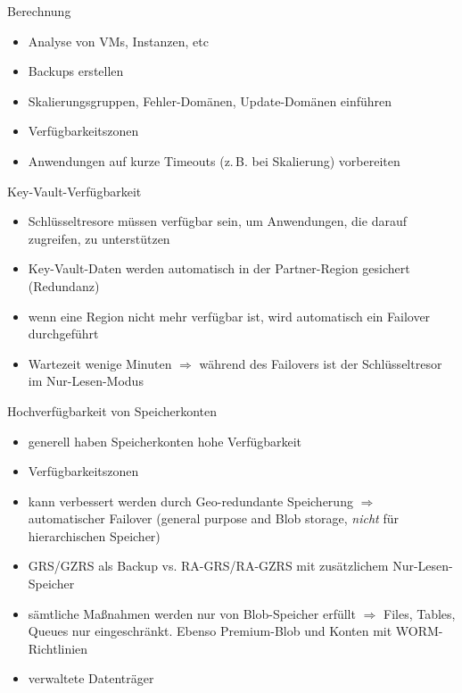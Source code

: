 \begin{flashcard}[]{Berechnung}
  \begin{itemize}
    \item Analyse von VMs, Instanzen, etc
    \item Backups erstellen
    \item Skalierungsgruppen, Fehler-Domänen, Update-Domänen einführen
    \item Verfügbarkeitszonen
    \item Anwendungen auf kurze Timeouts (z.\,B. bei Skalierung) vorbereiten
  \end{itemize}
\end{flashcard}

\begin{flashcard}[]{Key-Vault-Verfügbarkeit}
  \begin{itemize}
    \item[!] Schlüsseltresore müssen verfügbar sein, um Anwendungen, die darauf zugreifen, zu unterstützen
    \item Key-Vault-Daten werden automatisch in der Partner-Region gesichert (Redundanz)
    \item wenn eine Region nicht mehr verfügbar ist, wird automatisch ein Failover durchgeführt
    \item Wartezeit wenige Minuten\newline
      $\Rightarrow$ während des Failovers ist der Schlüsseltresor im Nur-Lesen-Modus
  \end{itemize}
\end{flashcard}


\begin{flashcard}[]{Hochverfügbarkeit von Speicherkonten}
  \begin{itemize}
    \item generell haben Speicherkonten hohe Verfügbarkeit
    \item Verfügbarkeitszonen
    \item kann verbessert werden durch Geo-redundante Speicherung\newline
      $\Rightarrow$ automatischer Failover (general purpose and Blob storage, \emph{nicht} für hierarchischen Speicher)
    \item GRS/GZRS als Backup vs. RA-GRS/RA-GZRS mit zusätzlichem Nur-Lesen-Speicher
    \item[!] sämtliche Maßnahmen werden nur von Blob-Speicher erfüllt\newline
      $\Rightarrow$ Files, Tables, Queues nur eingeschränkt. Ebenso Premium-Blob und Konten mit WORM-Richtlinien
    \item verwaltete Datenträger
  \end{itemize}
\end{flashcard}
